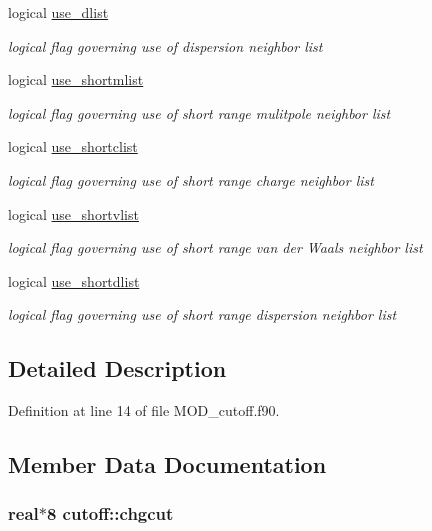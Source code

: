 \begin{DoxyCompactItemize}
logical \hyperlink{classcutoff_a8f39dc744b728faec4b715520f090fa2}{use\-\_\-dlist}
\begin{DoxyCompactList}\small\item\em logical flag governing use of dispersion neighbor list \end{DoxyCompactList}\item 
logical \hyperlink{classcutoff_a98b34e44f9906503e22e8e709639b943}{use\-\_\-shortmlist}
\begin{DoxyCompactList}\small\item\em logical flag governing use of short range mulitpole neighbor list \end{DoxyCompactList}\item 
logical \hyperlink{classcutoff_a7f60ea68482e53cd6aeaa473aa5df2f7}{use\-\_\-shortclist}
\begin{DoxyCompactList}\small\item\em logical flag governing use of short range charge neighbor list \end{DoxyCompactList}\item 
logical \hyperlink{classcutoff_ac023f2c34db51f8df3d3cfb95315adcf}{use\-\_\-shortvlist}
\begin{DoxyCompactList}\small\item\em logical flag governing use of short range van der Waals neighbor list \end{DoxyCompactList}\item 
logical \hyperlink{classcutoff_afe3f26d96ac426c3ef7c8d2c4304538c}{use\-\_\-shortdlist}
\begin{DoxyCompactList}\small\item\em logical flag governing use of short range dispersion neighbor list \end{DoxyCompactList}\end{DoxyCompactItemize}


\subsection{Detailed Description}


Definition at line 14 of file M\-O\-D\-\_\-cutoff.\-f90.



\subsection{Member Data Documentation}
\hypertarget{classcutoff_abe0483dfbdbe284cc5914fe66e689711}{
\subsubsection[{chgcut}]{\setlength{\rightskip}{0pt plus 5cm}real$\ast$8 cutoff\-::chgcut}}\label{classcutoff_abe0483dfbdbe284cc5914fe66e689711}


